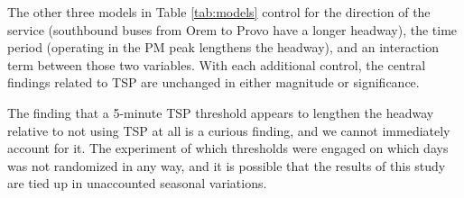 \documentclass[3p, authoryear, review]{elsarticle} %
\begin{document}
The other three models in Table \ref{tab:models} control for the direction
of the service (southbound buses from Orem to Provo have a longer headway), the
time period (operating in the PM peak lengthens the headway), and an interaction
term between those two variables. With each additional control, the central
findings related to TSP are unchanged in either magnitude or significance.

The finding that a 5-minute TSP threshold appears to lengthen the headway
relative to not using TSP at all is a curious finding, and we cannot immediately
account for it. The experiment of which thresholds were engaged on which days
was not randomized in any way, and it is possible that the results of this
study are tied up in unaccounted seasonal variations.


\end{document}
